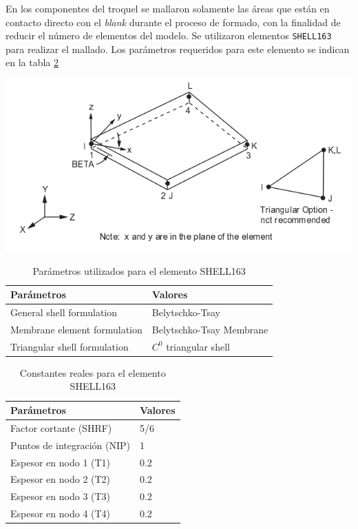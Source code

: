 En los componentes del troquel se mallaron solamente las áreas que están en contacto directo con el 
\textit{blank} durante el proceso de formado, con la finalidad de reducir el número de elementos del modelo. 
Se utilizaron elementos \texttt{SHELL163} para realizar el mallado. Los parámetros requeridos para 
este elemento se indican en la tabla \ref{tab:shell_param}

\begin{center}
\includegraphics[scale=0.65]{src/ch3/shell163.png}
\label{fig:shell163}
\end{center}


\begin{table}[h]
\centering
\caption{Parámetros utilizados para el elemento SHELL163}
\label{}
\begin{tabular}{p{6cm} p{6cm}} \hline
Parámetros & Valores \\
\hline
General shell formulation & Belytschko-Tsay \\
Membrane element formulation & Belytschko-Tsay Membrane \\
Triangular shell formulation & $C^0$ triangular shell \\
\hline
\end{tabular}
\label{tab:shell_param}
\end{table}


\begin{table}[h]
\centering
\caption{Constantes reales para el elemento SHELL163}
\label{}
\begin{tabular}{p{6cm} p{3cm}} \hline
Parámetros & Valores \\
\hline
Factor cortante (SHRF) & 5/6 \\
Puntos de integración (NIP) & 1 \\
Espesor en nodo 1 (T1) & 0.2 \\
Espesor en nodo 2 (T2) & 0.2 \\
Espesor en nodo 3 (T3) & 0.2 \\
Espesor en nodo 4 (T4) & 0.2 \\
\hline
\end{tabular}
\label{tab:shell_param}
\end{table}



